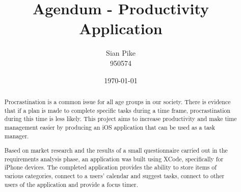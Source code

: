 \documentclass[11pt, a4paper, twoside, openright]{custard}
\begin{document}
	
\title{Agendum - Productivity Application}
\author{Sian Pike\protect\\{\normalsize 950574}}
\date{\today}
\frontmatter%
\maketitle
\cleardoublepage
\declaration
\cleardoublepage

\begin{abstract}
	\setcounter{page}{1}
	Procrastination is a common issue for all age groups in our society.  There is evidence that if a plan is made to complete specific tasks during a time frame, procrastination during this time is less likely.  This project aims to increase productivity and make time management easier by producing an iOS application that can be used as a task manager.
	
	Based on market research and the results of a small questionnaire carried out in the requirements analysis phase, an application was built using XCode, specifically for iPhone devices.  The completed application provides the ability to store items of various categories, connect to a users' calendar and suggest tasks, connect to other users of the application and provide a focus timer.
\end{abstract}
\newpage
	
\tableofcontents*
\mainmatter













\newpage
\bibintoc
 
\appendix
\addappheadtotoc

\end{document}
